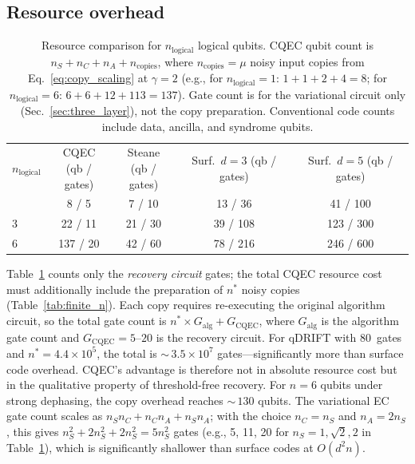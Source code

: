 \documentclass[prx,twocolumn,superscriptaddress,longbibliography,floatfix]{revtex4-2}
\begin{document}
\subsection{Resource overhead}
\label{sec:resources}

\begin{table}[H]
\caption{Resource comparison for $n_\mathrm{logical}$ logical qubits. CQEC qubit count is $n_S + n_C + n_A + n_\mathrm{copies}$, where $n_\mathrm{copies} = \mu$ noisy input copies from Eq.~\eqref{eq:copy_scaling} at $\gamma = 2$ (e.g., for $n_\mathrm{logical} = 1$: $1 + 1 + 2 + 4 = 8$; for $n_\mathrm{logical} = 6$: $6 + 6 + 12 + 113 = 137$). Gate count is for the variational circuit only (Sec.~\ref{sec:three_layer}), not the copy preparation. Conventional code counts include data, ancilla, and syndrome qubits.}
\label{tab:resources}
\begin{ruledtabular}
\begin{tabular}{lcccc}
$n_\mathrm{logical}$ & \makecell{CQEC\\(qb / gates)} & \makecell{Steane\\(qb / gates)} & \makecell{Surf.\ $d\!=\!3$\\(qb / gates)} & \makecell{Surf.\ $d\!=\!5$\\(qb / gates)} \\
\colrule
1 & 8 / 5 & 7 / 10 & 13 / 36 & 41 / 100 \\
3 & 22 / 11 & 21 / 30 & 39 / 108 & 123 / 300 \\
6 & 137 / 20 & 42 / 60 & 78 / 216 & 246 / 600 \\
\end{tabular}
\end{ruledtabular}
\end{table}

Table~\ref{tab:resources} counts only the \emph{recovery circuit} gates; the total CQEC resource cost must additionally include the preparation of $n^*$ noisy copies (Table~\ref{tab:finite_n}).
Each copy requires re-executing the original algorithm circuit, so the total gate count is $n^* \times G_\mathrm{alg} + G_\mathrm{CQEC}$, where $G_\mathrm{alg}$ is the algorithm gate count and $G_\mathrm{CQEC} = 5$--$20$ is the recovery circuit.
For qDRIFT with 80~gates and $n^* = 4.4 \times 10^5$, the total is ${\sim}\,3.5 \times 10^7$ gates---significantly more than surface code overhead.
CQEC's advantage is therefore not in absolute resource cost but in the qualitative property of threshold-free recovery.
For $n = 6$ qubits under strong dephasing, the copy overhead reaches ${\sim}\,130$ qubits.
The variational EC gate count scales as $n_S n_C + n_C n_A + n_S n_A$; with the choice $n_C = n_S$ and $n_A = 2n_S$, this gives $n_S^2 + 2n_S^2 + 2n_S^2 = 5n_S^2$ gates (e.g., 5, 11, 20 for $n_S = 1, \sqrt{2}, 2$ in Table~\ref{tab:resources}), which is significantly shallower than surface codes at $O(d^2 n)$.
\end{document}
